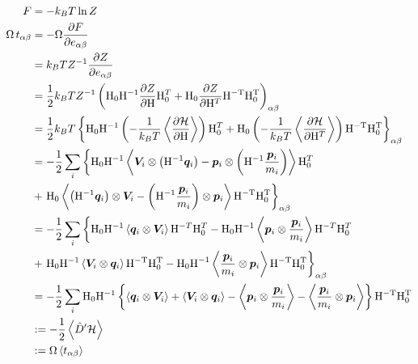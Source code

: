 \documentclass[11pt,a4paper,uplatex]{jsarticle}
\begin{document}
\begin{align}
    F &= - k_{B} T  \ln Z \\
    \Omega \, t_{\alpha \beta} &= - \Omega \frac{\partial F}{\partial e_{\alpha \beta}} \\
    &= k_{B} T Z^{-1} \frac{\partial Z}{\partial e_{\alpha \beta}} \\
    &= \frac{1}{2} k_{B} T Z^{-1} \left({\rm H_{0}H^{-1}}\frac{\partial Z}{\partial {\rm H}}{\rm H}_{0}^{T} + {\rm H_{0}}\frac{\partial Z}{\partial {\rm H}^T}{\rm H^{-T}}{\rm H_{0}^{T}}\right)_{\alpha \beta} \\ 
    &= \frac{1}{2} k_{B} T \left\{ {\rm H_{0}H^{-1}}\left(-\frac{1}{k_{B}T} \left< \frac{\partial {\cal H}}{\partial {\rm H}}\right> \right){\rm H}_{0}^{T}  
    + {\rm H_{0}} \left(-\frac{1}{k_{B}T} \left< \frac{\partial {\cal H}}{\partial {\rm H}^{T}}\right> \right){\rm H^{-T}}{\rm H_{0}^{T}}\right\}_{\alpha \beta} \\  
    &= -\frac{1}{2} \sum_{i} \left\{ {\rm H_{0}H^{-1}}\left< \bm{V}_{i}  \otimes \left({\rm H}^{-1} \bm{q}_{i}\right) - \bm{p}_{i} \otimes \left( {\rm H}^{-1}\frac{\bm{p}_{i}}{m_{i}}  \right)  \right> {\rm H}_{0}^{T} \right.\\
    &+ \left. {\rm H_{0}} \left< \left({\rm H}^{-1} \bm{q}_{i}\right) \otimes \bm{V}_{i}
    -  \left( {\rm H}^{-1}\frac{\bm{p}_{i}}{m_{i}}  \right) \otimes \bm{p}_{i} \right> {\rm H^{-T}}{\rm H_{0}^{T}}\right\}_{\alpha \beta} \\ 
    &= -\frac{1}{2} \sum_{i} \left\{ {\rm H_{0}H^{-1}}\left< \bm{q}_{i} \otimes \bm{V}_{i} \right> {\rm H}^{-T} {\rm H}_{0}^{T} - {\rm H_{0} H^{-1}} \left<\bm{p}_{i} \otimes \frac{\bm{p}_{i}}{m_{i}}   \right> {\rm H}^{-T} {\rm H}_{0}^{T} \right.\\
    &+ \left. {\rm H_{0}}{\rm H}^{-1}  \left< \bm{V}_{i} \otimes  \bm{q}_{i} \right> {\rm H^{-T} H_{0}^{T}} 
    -   {\rm H_{0} H}^{-1} \left< \frac{\bm{p}_{i}}{m_{i}} \otimes \bm{p}_{i} \right> {\rm H^{-T}}{\rm H_{0}^{T}}\right\}_{\alpha \beta} \\
    &= -\frac{1}{2} \sum_{i} {\rm H_{0}H^{-1}} \left\{ \left< \bm{q}_{i} \otimes \bm{V}_{i} \right>  + \left< \bm{V}_{i} \otimes  \bm{q}_{i} \right> - \left<\bm{p}_{i} \otimes \frac{\bm{p}_{i}}{m_{i}}   \right>  
    -  \left< \frac{\bm{p}_{i}}{m_{i}} \otimes \bm{p}_{i} \right> \right\} {\rm H^{-T}}{\rm H_{0}^{T}} \\
    &:= -\frac{1}{2} \left< \hat{D}' {\cal H} \right> \\
    &:= \Omega \left< t_{\alpha \beta} \right>
\end{align}
\end{document}
